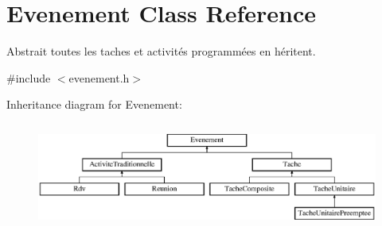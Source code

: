 \hypertarget{class_evenement}{}\section{Evenement Class Reference}
\label{class_evenement}


Abstrait toutes les taches et activités programmées en héritent.  




{\ttfamily \#include $<$evenement.\+h$>$}

Inheritance diagram for Evenement\+:\begin{figure}[H]
\begin{center}
\leavevmode
\includegraphics[height=3.544304cm]{class_evenement}
\end{center}
\end{figure}
